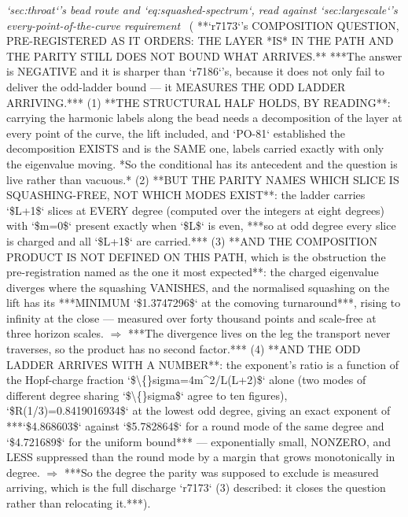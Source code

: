 \begin{description}
\textit{`sec:throat`'s bead route and `eq:squashed-spectrum`, read against `sec:largescale`'s every-point-of-the-curve requirement} \ ( **`r7173`'s COMPOSITION QUESTION, PRE-REGISTERED AS IT ORDERS: THE LAYER *IS* IN THE PATH AND THE PARITY STILL DOES NOT BOUND WHAT ARRIVES.** ***The answer is NEGATIVE and it is sharper than `r7186`'s, because it does not only fail to deliver the odd-ladder bound --- it MEASURES THE ODD LADDER ARRIVING.*** (1) **THE STRUCTURAL HALF HOLDS, BY READING**: carrying the harmonic labels along the bead needs a decomposition of the layer at every point of the curve, the lift included, and `PO-81` established the decomposition EXISTS and is the SAME one, labels carried exactly with only the eigenvalue moving. *So the conditional has its antecedent and the question is live rather than vacuous.*  (2) **BUT THE PARITY NAMES WHICH SLICE IS SQUASHING-FREE, NOT WHICH MODES EXIST**: the ladder carries `\$L+1\$` slices at EVERY degree (computed over the integers at eight degrees) with `\$m=0\$` present exactly when `\$L\$` is even, ***so at odd degree every slice is charged and all `\$L+1\$` are carried.***  (3) **AND THE COMPOSITION PRODUCT IS NOT DEFINED ON THIS PATH, which is the obstruction the pre-registration named as the one it most expected**: the charged eigenvalue diverges where the squashing VANISHES, and the normalised squashing on the lift has its ***MINIMUM `\$1.3747296\$` at the comoving turnaround***, rising to infinity at the close --- measured over forty thousand points and scale-free at three horizon scales. \ensuremath{\Rightarrow} ***The divergence lives on the leg the transport never traverses, so the product has no second factor.*** (4) **AND THE ODD LADDER ARRIVES WITH A NUMBER**: the exponent's ratio is a function of the Hopf-charge fraction `\$\textbackslash\{\}sigma=4m\textasciicircum{}2/L(L+2)\$` alone (two modes of different degree sharing `\$\textbackslash\{\}sigma\$` agree to ten figures), `\$R(1/3)=0.8419016934\$` at the lowest odd degree, giving an exact exponent of ***`\$4.868603\$` against `\$5.782864\$` for a round mode of the same degree and `\$4.721689\$` for the uniform bound*** --- exponentially small, NONZERO, and LESS suppressed than the round mode by a margin that grows monotonically in degree. \ensuremath{\Rightarrow} ***So the degree the parity was supposed to exclude is measured arriving, which is the full discharge `r7173` (3) described: it closes the question rather than relocating it.***). 

\end{description}
